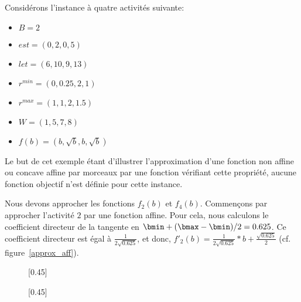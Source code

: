 \begin{ex}
  \label{ex_approx_CECSP}
  Considérons l'instance à  quatre activités suivante:
  \begin{itemize}
  \item $B=2$
  \item $est=(0,2,0,5)$
  \item $let=(6,10,9,13)$
  \item $r^{min}=(0,0.25,2,1)$
  \item $r^{max}=(1,1,2,1.5)$
  \item $W=(1,5,7,8)$
  \item $f(b)=(b,\sqrt{b},b,\sqrt{b})$
  \end{itemize}
  Le but de cet exemple étant d'illustrer l'approximation d'une
  fonction non affine ou concave affine par morceaux par une fonction
  vérifiant cette propriété, aucune fonction objectif n'est définie pour
  cette instance.

  Nous devons approcher les fonctions $f_2(b)$ et $f_4(b)$. Commençons
  par approcher l'activité $2$ par une fonction affine. Pour
  cela, nous calculons le coefficient directeur de la tangente en
  $\bmin + (\bmax-\bmin)/ 2 =0.625$. Ce coefficient directeur est égal à
  $\frac{1}{2\sqrt{0.625}}$, et donc,
  $f'_2(b)=\frac{1}{2\sqrt{0.625}}*b+ \frac{\sqrt{0.625}}{2}$
  (cf. figure~\ref{approx_aff}).  

  \begin{figure}[!htb]
    \centering
    [0.45\linewidth]{
      }
    \hfill
    [0.45\linewidth]{
      }
\end{figure}
\end{ex}
